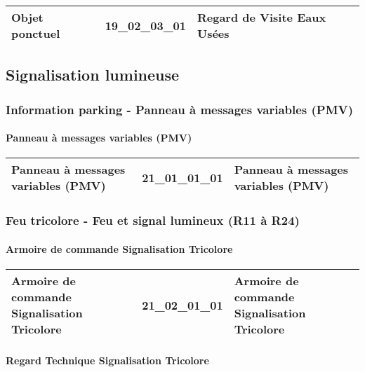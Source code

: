 \documentclass[12pt,titlepage,oneside]{book}
\begin{document}
\renewcommand{\arraystretch}{1.2}
\begin{supertabular}{|p{10cm}|c|p{15cm}|}
 Objet ponctuel & 19\_02\_03\_01 & Regard de Visite Eaux Usées\\
\hline
\end{supertabular}
\subsection{Signalisation lumineuse}
\subsubsection{\large Information parking - Panneau à messages variables (PMV)}
\paragraph{Panneau à messages variables (PMV)}
\noindent
\vspace{\baselineskip}

\renewcommand{\arraystretch}{1.2}
\begin{supertabular}{|p{10cm}|c|p{15cm}|}
 Panneau à messages variables (PMV) & 21\_01\_01\_01 & Panneau à messages variables (PMV)\\
\hline
\end{supertabular}

\subsubsection{\large Feu tricolore - Feu et signal lumineux (R11 à R24)}
\paragraph{Armoire de commande Signalisation Tricolore}
\noindent
\vspace{\baselineskip}

\renewcommand{\arraystretch}{1.2}
\begin{supertabular}{|p{10cm}|c|p{15cm}|}
 Armoire de commande Signalisation Tricolore & 21\_02\_01\_01 & Armoire de commande Signalisation Tricolore\\
\hline
\end{supertabular}


\paragraph{Regard Technique Signalisation Tricolore}
\noindent
\vspace{\baselineskip}
\end{document}
